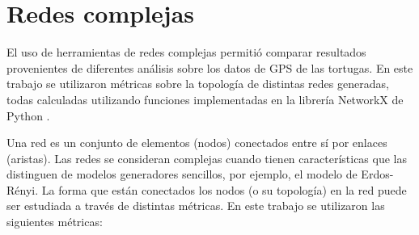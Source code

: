 \section{Redes complejas}
El uso de herramientas de redes complejas permitió comparar resultados provenientes de diferentes análisis sobre los datos de GPS de las tortugas. En este trabajo se utilizaron métricas sobre la topología de distintas redes generadas, todas calculadas utilizando  funciones implementadas en la librería NetworkX de Python \cite{networkx}.
 
Una red es un conjunto de elementos (nodos) conectados entre sí por enlaces (aristas). Las redes se consideran complejas cuando tienen características que las distinguen de modelos generadores sencillos, por ejemplo, el modelo de Erdos-Rényi. La forma que están conectados los nodos (o su topología) en la red puede ser estudiada a través de distintas métricas. En este trabajo se utilizaron las siguientes métricas:
